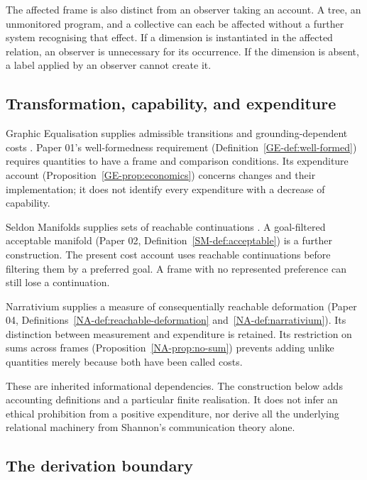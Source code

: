 \documentclass[11pt,a4paper]{article}
\theoremstyle{remark}
\begin{document}
The affected frame is also distinct from an observer taking an account. A tree,
an unmonitored program, and a collective can each be affected without a further
system recognising that effect. If a dimension is instantiated in the affected
relation, an observer is unnecessary for its occurrence. If the dimension is
absent, a label applied by an observer cannot create it.

\subsection{Transformation, capability, and expenditure}

Graphic Equalisation supplies admissible transitions and grounding-dependent
costs \citep{parslow01equalisation}. Paper 01's well-formedness requirement
(Definition~\ref{GE-def:well-formed}) requires quantities to have a frame and
comparison conditions. Its expenditure account
(Proposition~\ref{GE-prop:economics}) concerns changes and their implementation;
it does not identify every expenditure with a decrease of capability.

Seldon Manifolds supplies sets of reachable continuations
\citep{parslow02manifolds}. A goal-filtered
acceptable manifold (Paper 02, Definition~\ref{SM-def:acceptable}) is a further
construction. The present cost account uses reachable continuations before
filtering them by a preferred goal. A frame with no represented preference can
still lose a continuation.

Narrativium supplies a measure of consequentially reachable deformation
\citep{parslow04narrativium}
(Paper 04, Definitions~\ref{NA-def:reachable-deformation}
and~\ref{NA-def:narrativium}). Its distinction between measurement and
expenditure is retained. Its restriction on sums across frames
(Proposition~\ref{NA-prop:no-sum}) prevents adding unlike quantities merely
because both have been called costs.

These are inherited informational dependencies. The construction below adds
accounting definitions and a particular finite realisation. It does not infer
an ethical prohibition from a positive expenditure, nor derive all the
underlying relational machinery from Shannon's communication theory alone.

\subsection{The derivation boundary}
\end{document}
